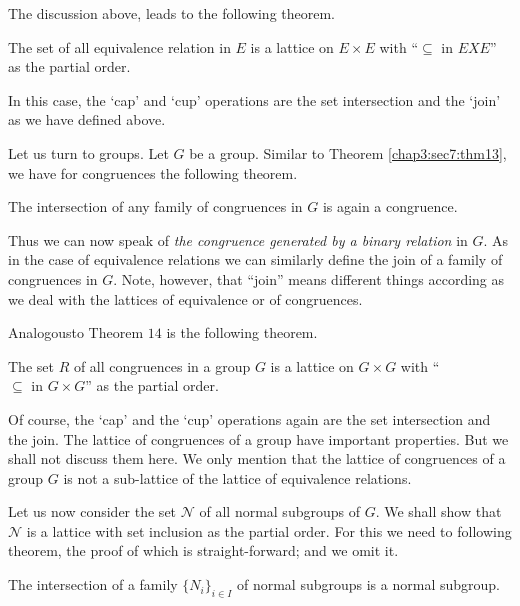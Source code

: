 The discussion above, leads to the following theorem. 

\begin{theorem}\label{chap3:sec7:thm14}%
  The set of all equivalence relation in $E$ is a lattice on $E\times
  E $ with ``$\subseteq \text{ in } E X E$'' as the partial order. 
\end{theorem} 
 
In this case, the `cap' and `cup' operations are the set intersection
and the `join' as we have defined above. 
 
Let us turn to groups. Let $G$ be a group. Similar to
Theorem \ref{chap3:sec7:thm13}, we
have for congruences the following theorem. 

\begin{theorem}\label{chap3:sec7:thm15} %
  The intersection of any family of congruences in $G$ is again a
  congruence. 
\end{theorem}

Thus we can now speak of \textit{the congruence generated by a binary
  relation} in $G$. As in the case of equivalence relations we can
similarly define the join  of a family of congruences in $G$. Note,
however, that ``join'' means different things according as we deal
with the lattices of equivalence or of congruences.  

Analogous\pageoriginale to Theorem $14$ is the following theorem.
\begin{theorem}\label{chap3:sec7:thm16} %
  The set $R$ of all congruences in a group $G$ is a lattice on $G
  \times G$ with ``$ \subseteq \text { in } G \times G$'' as the
  partial order.  
\end{theorem}  
 
Of course, the `cap' and the `cup' operations again are the set
intersection and the join. The lattice of congruences of a group have
important properties. But we shall not discuss them here. We only
mention that the lattice of congruences of a group $G$ is not a
sub-lattice of the lattice of equivalence relations.   

Let us now consider the set $\mathscr{N}$ of all normal subgroups of
$G$. We shall show that $\mathscr{N}$ is a lattice with set inclusion
as the partial order. For this we need to following theorem, the proof
of which is straight-forward; and we omit it.   

\begin{theorem}\label{chap3:sec7:thm17} %
  The intersection of a family $\{ N_i\}_{i \in  I}$ of normal
  subgroups is a normal subgroup. 
\end{theorem} 

